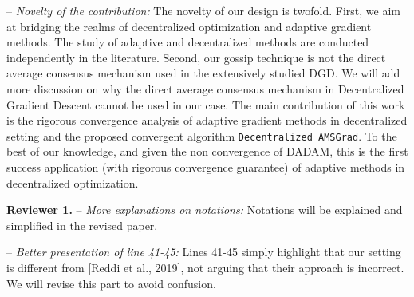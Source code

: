 \documentclass{article}
\begin{document}
-- \textit{Novelty of the contribution:} The novelty of our design is twofold.
First, we aim at bridging the realms of decentralized optimization and adaptive gradient methods. 
The study of adaptive and decentralized methods are conducted independently in the literature. 
Second, our gossip technique is not the direct average consensus mechanism used in the extensively studied DGD.
We will add more discussion on why the direct average consensus mechanism in Decentralized Gradient Descent cannot be used in our case.
The main contribution of this work is the rigorous convergence analysis of adaptive gradient methods in decentralized setting and the proposed convergent algorithm \texttt{Decentralized AMSGrad}. 
To the best of our knowledge, and given the non convergence of DADAM, this is the first success application (with rigorous convergence guarantee) of adaptive methods in decentralized optimization. 

\vspace{-2pt}


\textbf{Reviewer 1.} 
-- \textit{More explanations on notations:} 
Notations will be explained and simplified in the revised paper.\vspace{-5pt}

-- \textit{Better presentation of line 41-45:} Lines 41-45 simply highlight that our setting is different from  [Reddi et al., 2019], not arguing that their approach is incorrect. We will revise this part to avoid confusion.\vspace{-5pt}
\end{document}
